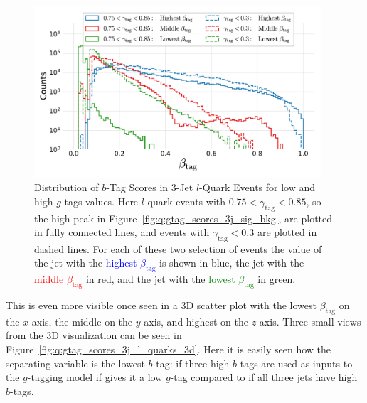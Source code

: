 \begin{figure}[h!]
  \centerfloat
  \includegraphics[width=0.95\textwidth, trim=10 10 10 10, clip]{figures/quarks/leptons_high_g_tag_3j_0.75_gtag_0.85-down_sample=1.00-ML_vars=vertex-selection=b-ejet_min=4-n_iter_RS_lgb=99-n_iter_RS_xgb=9-cdot_cut=0.90-version=19.pdf}
  \caption[Distribution of $b$-Tag Scores in 3-Jet $l$-Quark Events for Low and High $g$-Tag Values]
          {Distribution of $b$-Tag Scores in 3-Jet $l$-Quark Events for low and high $g$-tags values. Here $l$-quark events with $0.75 < \gamma_\mathrm{tag} <  0.85$, so the high peak in Figure~\ref{fig:q:gtag_scores_3j_sig_bkg}, are plotted in fully connected lines, and events with $\gamma_\mathrm{tag} <  0.3$ are plotted in dashed lines. For each of these two selection of events the value of the jet with the \textcolor{blue}{highest $\beta_\mathrm{tag}$} is shown in blue, the jet with the \textcolor{red}{middle $\beta_\mathrm{tag}$} in red, and the jet with the \textcolor{green}{lowest $\beta_\mathrm{tag}$} in green.} 
  \label{fig:q:gtag_scores_3j_l_quarks}
\end{figure}

This is even more visible once seen in a 3D scatter plot with the lowest $\beta_\mathrm{tag}$ on the $x$-axis, the middle on the $y$-axis, and highest on the $z$-axis. Three small views from the 3D visualization can be seen in Figure~\ref{fig:q:gtag_scores_3j_l_quarks_3d}. Here it is easily seen how the separating variable is the lowest $b$-tag: if three high $b$-tags are used as inputs to the $g$-tagging model if gives it a low $g$-tag compared to if all three jets have high $b$-tags.

